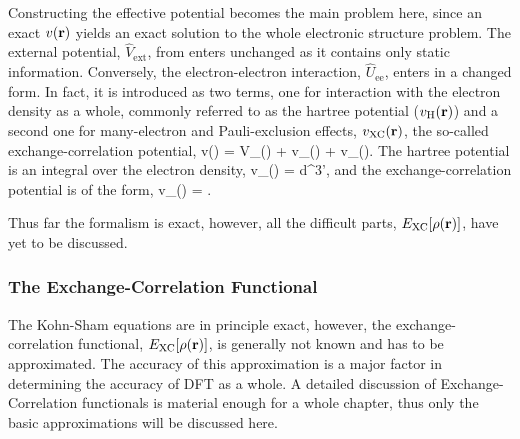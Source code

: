 Constructing the effective potential becomes the main problem here, since an exact $v({\mathrm{\mathbf{\bm{r}}}})$ yields an exact solution to the whole electronic structure problem.
The external potential, $\widehat{V}_\text{ext}$, from  enters unchanged as it contains only static information.
Conversely, the electron-electron interaction, $\widehat{U}_\text{ee}$, enters in a changed form.
In fact, it is introduced as two terms, one for interaction with the electron density as a whole, commonly referred to as the hartree potential ($v_\text{H}({\mathrm{\mathbf{\bm{r}}}})$) and a second one for many-electron and Pauli-exclusion effects, $v_\text{XC}({\mathrm{\mathbf{\bm{r}}}})$, the so-called exchange-correlation potential,
v(\vr) = V_(\vr) + v_(\vr) + v_(\vr).
\eeq
The hartree potential is an integral over the electron density,
v_(\vr) = \int {}d^3\vr',
\eeq
and the exchange-correlation potential is of the form,
v_(\vr) = .
\eeq

Thus far the formalism is exact, however, all the difficult parts, $E_\text{XC}[\rho({\mathrm{\mathbf{\bm{r}}}})]$, have yet to be discussed.

\subsubsection{The Exchange-Correlation Functional}
The Kohn-Sham equations are in principle exact, however, the exchange-correlation functional, $E_\text{XC}[\rho({\mathrm{\mathbf{\bm{r}}}})]$, is generally not known and has to be approximated.
The accuracy of this approximation is a major factor in determining the accuracy of DFT as a whole.
A detailed discussion of Exchange-Correlation functionals is material enough for a whole chapter, thus only the basic approximations will be discussed here.

